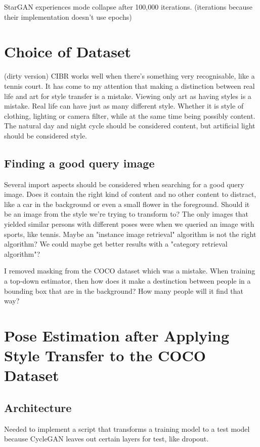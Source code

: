 StarGAN experiences mode collapse after 100,000 iterations. (iterations because their implementation doesn't use epochs)
\section{Choice of Dataset}
(dirty version)
CIBR works well when there's something very recognisable, like a tennis court.
It has come to my attention that making a distinction between real life and art for style transfer is a mistake.
Viewing only art as having styles is a mistake.
Real life can have just as many different style.
Whether it is style of clothing, lighting or camera filter, while at the same time being possibly content.
The natural day and night cycle should be considered content, but artificial light should be considered style.
\subsection{Finding a good query image}
Several import aspects should be considered when searching for a good query image.
Does it contain the right kind of content and no other content to distract, like a car in the background or even a small flower in the foreground.
Should it be an image from the style we're trying to transform to?
The only images that yielded similar persons with different poses were when we queried an image with sports, like tennis.
Maybe an "instance image retrieval" algorithm is not the right algorithm? We could maybe get better results with a "category retrieval algorithm"?

I removed masking from the COCO dataset which was a mistake. 
When training a top-down estimator, then how does it make a destinction between people in a bounding box that are in the background?
How many people will it find that way?

\section{Pose Estimation after Applying Style Transfer to the COCO Dataset}
\label{sec:baseline_coco_style_transfer}

\subsection{Architecture}
\label{sec:baseline_coco_style_transfer_architecture}
Needed to implement a script that transforms a training model to a test model because CycleGAN leaves out certain layers for test, like dropout.

